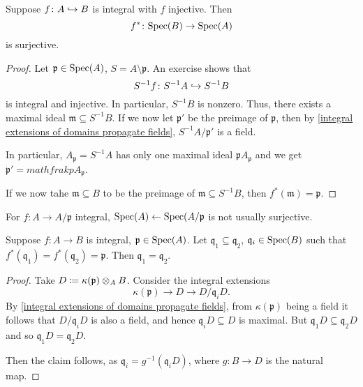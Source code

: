 \begin{prop}
  Suppose $f \colon A \hookrightarrow B$ is integral with $f$ injective. Then
  \[ f^* \colon \text{Spec}(B) \to \text{Spec}(A)\]
  is surjective.
\end{prop}
\begin{proof}
  Let $\mathfrak p \in \text{Spec}(A)$, $S = A \setminus \mathfrak p$. An exercise shows that
  \[ S^{-1} f \colon S^{-1} A \hookrightarrow S^{-1}B\]
  is integral and injective.
  In particular, $S^{-1}B$ is nonzero.
  Thus, there exists a maximal ideal $\mathfrak m \subseteq S^{-1}B$. If we now let $\mathfrak p'$ be the preimage of $\mathfrak p$, then by \cref{integral extensions of domains propagate fields}, $S^{-1}A /{\mathfrak p'}$ is a field.

  In particular, $A_{\mathfrak p} = S^{-1}A$ has only one maximal ideal $\mathfrak p A_{\mathfrak p}$ and we get $\mathfrak p' = mathfrak p A_{\mathfrak p}$.

  If we now tahe $\mathfrak m \subseteq B$ to be the preimage of $\mathfrak m \subseteq S^{-1}B$, then $f^*(\mathfrak m) = \mathfrak p$.
\end{proof}

\begin{note}
  For $f \colon A \to A/{\mathfrak p}$ integral, $\text{Spec}(A) \leftarrow \text{Spec}(A/{\mathfrak p}$ is not usually surjective.
\end{note}


\begin{prop}[incomparability]
  Suppose $f \colon A \to B$ is integral, $\mathfrak p \in \text{Spec}(A)$. Let $\mathfrak q_1 \subseteq \mathfrak q_2$, $\mathfrak q_i \in \text{Spec}(B)$ such that $f^*(\mathfrak q_1) = f^*(\mathfrak q_2) = \mathfrak p$. Then $\mathfrak q_1 = \mathfrak q_2$.
\end{prop}
\begin{proof}
  Take $D \coloneqq \kappa(\mathfrak p) \otimes_A B$. Consider the integral extensions
  \[ \kappa(\mathfrak p) \to D \to D/{\mathfrak q_i D}.\]
  By \cref{integral extensions of domains propagate fields}, from $\kappa(\mathfrak p)$ being a field it follows that $D/{\mathfrak q_i D}$ is also a field, and hence $\mathfrak q_i D \subseteq D$ is maximal. But $\mathfrak q_1 D \subseteq \mathfrak q_2 D$ and so $\mathfrak q_1 D = \mathfrak q_2 D$.

  Then the claim follows, as $\mathfrak q_i = g^{-1}(\mathfrak q_i D)$, where $g \colon B \to D$ is the natural map.
\end{proof}


